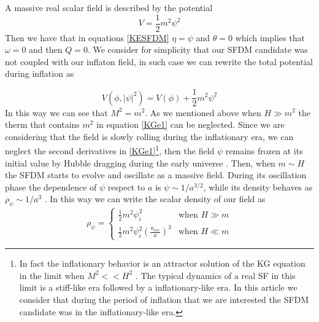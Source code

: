 \documentclass[amssymb,twocolumn,prd,nofootinbib,showpacs]{revtex4-1}
\begin{document}
A massive real scalar field is described by the potential 
\begin{equation}
V = \frac{1}{2}m^2\psi^2
\end{equation}
Then we have that in equations \eqref{KESFDM} $\eta=\psi$ and $\theta=0$ which implies that $\omega=0$ and then $Q = 0$. We consider for simplicity that our SFDM candidate was not coupled with our inflaton field, in such case we can rewrite the total potential during inflation as

\begin{equation}
V(\phi,|\psi|^2)=V(\phi)+\frac{1}{2}m^2\psi^2
\end{equation}
In this way we can see that $M^2=m^2$. As we mentioned above when $H\gg m^2$ the therm that contains $m^2$ in equation \eqref{KGe1} can be neglected. Since we are considering that the field is slowly rolling during the inflationary era, we can neglect the second derivatives in \eqref{KGe1}\footnote{In fact the inflationary behavior is an attractor solution of the KG equation in the limit when $M^2<<H^2$ \cite{atractorinf1,atractorinf2}. The typical dynamics of a real SF in this limit is a stiff-like era followed by a inflationary-like era. In this article we consider that during the period of inflation that we are interested the SFDM candidate was in the inflationary-like era.}, then the field $\psi$ remains frozen at its initial value by Hubble dragging during the early universe \cite{curvatonatractor}. Then, when $m\sim H$ the SFDM starts to evolve and oscillate as a massive field. During its oscillation phase the dependence of $\psi$ respect to $a$ is $\psi\sim 1/a^{3/2}$, while its density behaves as $\rho_{\psi}\sim 1/a^3$  \cite{SFphi41,SFphi42}. In this way we can write the scalar density of our field as
\begin{equation}\label{rhosfdm}
\rho_\psi = \left\lbrace\begin{array}{ll}
\frac{1}{2}m^2\psi_i^2 & \text{when }H\gg m \\
\frac{1}{2}m^2\psi_i^2\left(\frac{a_{osc}}{a}\right)^3 & \text{when }H\ll m
\end{array}\right .
\end{equation}
\end{document}
